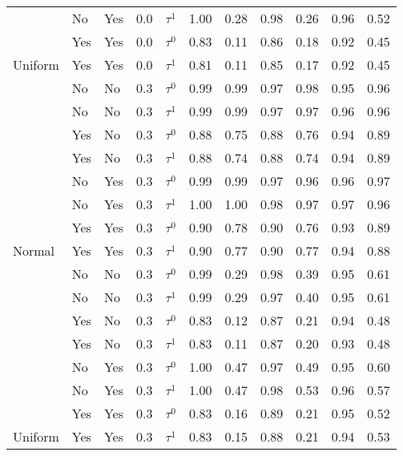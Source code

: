 \begin{tabular}[t]{lllrlrrrrrr}
 & No & Yes & 0.0 & $\tau^1$ & 1.00 & 0.28 & 0.98 & 0.26 & 0.96 & 0.52\\

 & Yes & Yes & 0.0 & $\tau^0$ & 0.83 & 0.11 & 0.86 & 0.18 & 0.92 & 0.45\\

\multirow{-8}{*}{\raggedright\arraybackslash Uniform} & Yes & Yes & 0.0 & $\tau^1$ & 0.81 & 0.11 & 0.85 & 0.17 & 0.92 & 0.45\\
\cmidrule{1-11}
 & No & No & 0.3 & $\tau^0$ & 0.99 & 0.99 & 0.97 & 0.98 & 0.95 & 0.96\\

 & No & No & 0.3 & $\tau^1$ & 0.99 & 0.99 & 0.97 & 0.97 & 0.96 & 0.96\\

 & Yes & No & 0.3 & $\tau^0$ & 0.88 & 0.75 & 0.88 & 0.76 & 0.94 & 0.89\\

 & Yes & No & 0.3 & $\tau^1$ & 0.88 & 0.74 & 0.88 & 0.74 & 0.94 & 0.89\\

 & No & Yes & 0.3 & $\tau^0$ & 0.99 & 0.99 & 0.97 & 0.96 & 0.96 & 0.97\\

 & No & Yes & 0.3 & $\tau^1$ & 1.00 & 1.00 & 0.98 & 0.97 & 0.97 & 0.96\\

 & Yes & Yes & 0.3 & $\tau^0$ & 0.90 & 0.78 & 0.90 & 0.76 & 0.93 & 0.89\\

\multirow{-8}{*}{\raggedright\arraybackslash Normal} & Yes & Yes & 0.3 & $\tau^1$ & 0.90 & 0.77 & 0.90 & 0.77 & 0.94 & 0.88\\
\cmidrule{1-11}
 & No & No & 0.3 & $\tau^0$ & 0.99 & 0.29 & 0.98 & 0.39 & 0.95 & 0.61\\

 & No & No & 0.3 & $\tau^1$ & 0.99 & 0.29 & 0.97 & 0.40 & 0.95 & 0.61\\

 & Yes & No & 0.3 & $\tau^0$ & 0.83 & 0.12 & 0.87 & 0.21 & 0.94 & 0.48\\

 & Yes & No & 0.3 & $\tau^1$ & 0.83 & 0.11 & 0.87 & 0.20 & 0.93 & 0.48\\

 & No & Yes & 0.3 & $\tau^0$ & 1.00 & 0.47 & 0.97 & 0.49 & 0.95 & 0.60\\

 & No & Yes & 0.3 & $\tau^1$ & 1.00 & 0.47 & 0.98 & 0.53 & 0.96 & 0.57\\

 & Yes & Yes & 0.3 & $\tau^0$ & 0.83 & 0.16 & 0.89 & 0.21 & 0.95 & 0.52\\

\multirow{-8}{*}{\raggedright\arraybackslash Uniform} & Yes & Yes & 0.3 & $\tau^1$ & 0.83 & 0.15 & 0.88 & 0.21 & 0.94 & 0.53\\
\bottomrule
\end{tabular}
